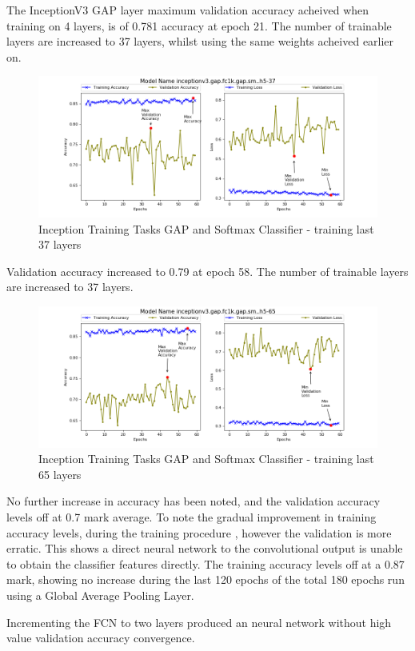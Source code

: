 \documentclass{IEEEtran}
\begin{document}
\begin{enumerate}
The InceptionV3 GAP layer maximum validation accuracy acheived when training on 4 layers, is of 0.781 accuracy at epoch 21. The number of trainable layers are increased to 37 layers, whilst using the same weights acheived earlier on. 

\begin{figure}[H]
\centering
\label{fig:incv3-gap-37}
\includegraphics[scale=0.6]{images/t1-i3-gap-sm-37.png}
\caption{Inception Training Tasks GAP and Softmax Classifier - training last 37 layers}
\end{figure}

Validation accuracy increased to 0.79 at epoch 58. The number of trainable layers are increased to 37 layers.

\begin{figure}[H]
\centering
\label{fig:incv3-gap-65}
\includegraphics[scale=0.6]{images/t1-i3-gap-sm-65.png}
\caption{Inception Training Tasks GAP and Softmax Classifier - training last 65 layers}
\end{figure}

No further increase in accuracy has been noted, and the validation accuracy levels off at 0.7 mark average. To note the gradual improvement in training accuracy levels, during the training procedure , however the validation is more erratic. This shows a direct neural network to the convolutional output is unable to obtain the classifier features directly. The training accuracy levels off at a 0.87 mark, showing no increase during the last 120 epochs of the total 180 epochs run using a Global Average Pooling Layer. \newline

Incrementing the FCN to two layers produced an neural network without high value validation accuracy convergence.

\end{enumerate}
\end{document}
